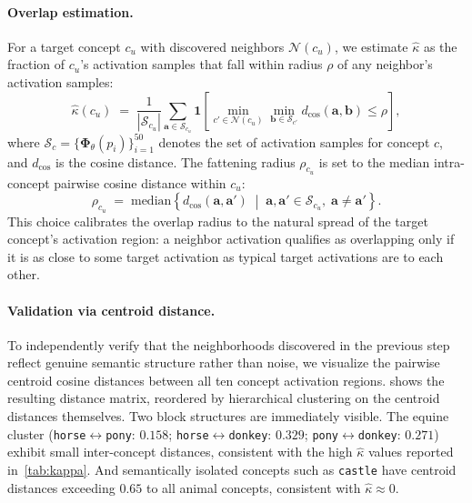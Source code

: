 
\paragraph{Overlap estimation.}
For a target concept $c_u$ with discovered neighbors $\mathcal{N}(c_u)$, we estimate $\hat\kappa$ as the fraction of $c_u$'s activation samples that fall within radius $\rho$ of any neighbor's activation samples:
\begin{equation}
    \hat\kappa(c_u) \;=\; \frac{1}{|\mathcal{S}_{c_u}|} \sum_{\mathbf{a} \in \mathcal{S}_{c_u}} \mathbf{1}\!\left[\min_{c' \in \mathcal{N}(c_u)} \min_{\mathbf{b} \in \mathcal{S}_{c'}} d_{\cos}(\mathbf{a}, \mathbf{b}) \leq \rho\right],
\end{equation}
where $\mathcal{S}_c = \{\boldsymbol{\Phi}_\theta(p_i)\}_{i=1}^{50}$ denotes the set of activation samples for concept $c$, and $d_{\cos}$ is the cosine distance. 
The fattening radius $\rho_{c_u}$ is set to the median intra-concept pairwise cosine distance within $c_u$:
\begin{equation}
    \rho_{c_u} \;=\; \mathrm{median}\!\left\{d_{\cos}(\mathbf{a}, \mathbf{a}') \;\middle|\; \mathbf{a}, \mathbf{a}' \in \mathcal{S}_{c_u},\; \mathbf{a} \neq \mathbf{a}'\right\}.
\end{equation}
This choice calibrates the overlap radius to the natural spread of the target concept's activation region: a neighbor activation qualifies as overlapping only if it is as close to some target activation as typical target activations are to each other.

\paragraph{Validation via centroid distance.}
To independently verify that the neighborhoods discovered in the previous step reflect genuine semantic structure rather than noise, we visualize the pairwise centroid cosine distances between all ten concept activation regions.  shows the resulting distance matrix, reordered by hierarchical clustering on the centroid distances themselves. Two block structures are immediately visible. The equine cluster (\texttt{horse}$\leftrightarrow$\texttt{pony}: $0.158$; \texttt{horse}$\leftrightarrow$\texttt{donkey}: $0.329$; \texttt{pony}$\leftrightarrow$\texttt{donkey}: $0.271$) 
exhibit small inter-concept distances, 
consistent with the high $\hat\kappa$ values reported in~\cref{tab:kappa}. 
And semantically isolated concepts such as \texttt{castle} have centroid distances exceeding $0.65$ to all animal concepts, consistent with $\hat\kappa \approx 0$.

